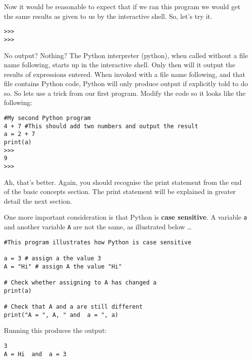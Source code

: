 Now it would be reasonable to expect that if we ran this program we   would get the same results as given to us by the interactive shell. So,   let's try it.     
\begin{lstlisting}
>>>
>>>
\end{lstlisting}

No output? Nothing? The Python interpreter (python), when called   without a file name following, starts up in the interactive shell. Only   then will it output the results of expressions entered. When invoked   with a file name following, and that file contains Python code, Python   will only produce output if explicitly told to do so. So lets use a trick    from our first program. Modify the code so it looks like the following:
\begin{lstlisting}
#My second Python program
4 + 7 #This should add two numbers and output the result
a = 2 + 7
print(a)
>>>
9
>>>
\end{lstlisting}

Ah, that's better. Again, you should recognise the print statement   from the end of the basic concepts section. The print statement will be   explained in greater detail the next section.

One more important consideration is that Python is \textbf{case   sensitive}. A variable \texttt{a} and another variable \texttt{A} are not the   same, as illustrated below \ldots
\begin{lstlisting}
#This program illustrates how Python is case sensitive

a = 3 # assign a the value 3
A = "Hi" # assign A the value "Hi"

# Check whether assigning to A has changed a
print(a)

# Check that A and a are still different
print("A = ", A, " and  a = ", a)
\end{lstlisting}

Running this produces the output:
\begin{lstlisting}
3
A = Hi  and  a = 3
\end{lstlisting}

